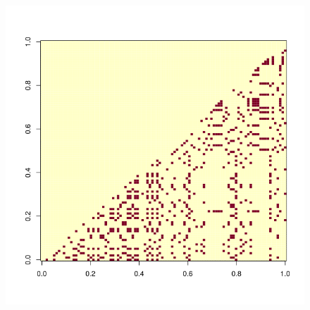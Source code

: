 \begin{figure}
\begin{minipage}{0.5\textwidth}
		\includegraphics[scale=0.35]{etc/diss_best.png}
	\end{minipage}
\end{figure}


